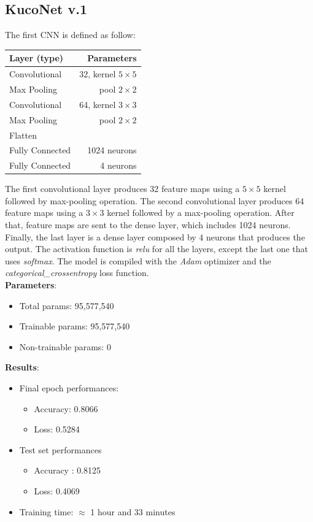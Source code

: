 \documentclass[11pt]{article}
\begin{document}
\subsection{KucoNet v.1}
The first CNN is defined as follow:
\begin{table}[H]
	\begin{center}
		\begin{tabular}{|l|r|}
			\hline
			\textbf{Layer (type)} & \textbf{Parameters} \\
			\hline
			Convolutional & 32, kernel $5 \times 5$ \\
			\hline
			Max Pooling & pool $2 \times 2$ \\
			\hline
			Convolutional & 64, kernel $3 \times 3$ \\
			\hline
			Max Pooling & pool $2 \times 2$ \\
			\hline
			Flatten & \\
			\hline
			Fully Connected & 1024 neurons  \\
			\hline
			Fully Connected & 4 neurons \\
			\hline 
		\end{tabular}
	\end{center}
\end{table} 
The first convolutional layer produces 32 feature maps using a $5 \times 5$ kernel followed by max-pooling operation. The second convolutional layer produces 64 feature maps using a $3 \times 3$ kernel followed by a max-pooling operation. After that, feature maps are sent to the dense layer, which includes 1024 neurons. Finally, the last layer is a dense layer  composed by 4 neurons that produces the output. The activation function is \textit{relu} for all the layers, except the last one that uses \textit{softmax}. The model is compiled with the \textit{Adam} optimizer and the \textit{categorical\_crossentropy} loss function. \\
\textbf{Parameters}:
\begin{itemize}
	\item Total params: 95,577,540
	\item Trainable params: 95,577,540
	\item Non-trainable params: 0
\end{itemize}
\textbf{Results}:
\begin{itemize}
	\item Final epoch performances:
	\begin{itemize}
		\item Accuracy: 0.8066
		\item Loss: 0.5284
	\end{itemize}
	\item Test set performances
	\begin{itemize}
		\item Accuracy : 0.8125
		\item Loss: 0.4069
	\end{itemize}
	\item Training time: $\approx$ 1 hour and 33 minutes
	
\end{itemize}
\end{document}
